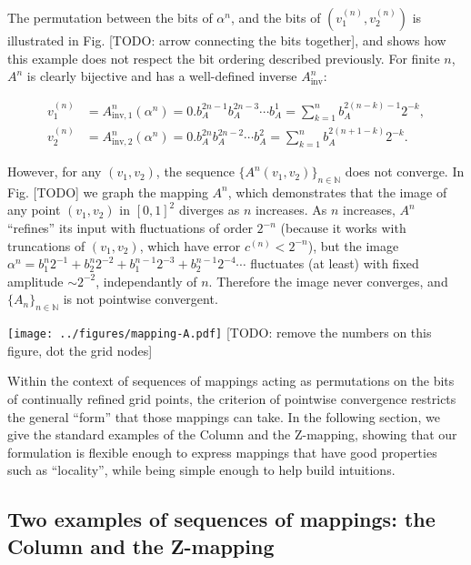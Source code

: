 \documentclass[10pt,letterpaper]{article}
\begin{document}
The permutation between the bits of $\alpha^n$, and the bits of $(v_1^{(n)}, v_2^{(n)})$ is illustrated in Fig. [TODO: arrow connecting the bits together], and shows how this example does not respect the bit ordering described previously.
For finite $n$, $A^n$ is clearly bijective and has a well-defined inverse $A^n_\textrm{inv}$:

\begin{equation*} \begin{aligned}
v_1^{(n)} &= A^n_{\textrm{inv},1}(\alpha^n) = 0.b_A^{2n-1} b_A^{2n-3} \cdots b_A^1 = \sum_{k=1}^n b_A^{2(n-k)-1} 2^{-k}, \\
v_2^{(n)} &= A^n_{\textrm{inv},2}(\alpha^n) = 0.b_A^{2n} b_A^{2n-2} \cdots b_A^2 = \sum_{k=1}^n b_A^{2(n+1-k)} 2^{-k}.
\end{aligned} \end{equation*}

However, for any $(v_1,v_2)$, the sequence $\{A^n(v_1, v_2)\}_{n \in \mathbb N}$ does not converge. In Fig. [TODO] we graph the mapping $A^n$, which demonstrates that the image of any point $(v_1,v_2)$ in $[0,1]^2$ diverges as $n$ increases. As $n$ increases, $A^n$ ``refines'' its input with fluctuations of order $2^{-n}$ (because it works with truncations of $(v_1, v_2)$, which have error $c^{(n)} < 2^{-n}$), but the image $\alpha^n=b_1^n 2^{-1} + b_2^n 2^{-2} + b_1^{n-1} 2^{-3} + b_2^{n-1} 2^{-4} \cdots$ fluctuates (at least) with fixed amplitude $\sim 2^{-2}$, independantly of $n$. Therefore the image never converges, and $\{A_n\}_{n \in \mathbb N}$ is not pointwise convergent.

\texttt{[image: ../figures/mapping-A.pdf]}
[TODO: remove the numbers on this figure, dot the grid nodes]
\endif

Within the context of sequences of mappings acting as permutations on the bits of continually refined grid points, the criterion of pointwise convergence restricts the general ``form'' that those mappings can take.
In the following section, we give the standard examples of the Column and the Z-mapping, showing that our formulation is flexible enough to express mappings that have good properties such as ``locality'', while being simple enough to help build intuitions.


\subsection{Two examples of sequences of mappings: the Column and the Z-mapping} \label{sec:mapping-examples}
\end{document}
